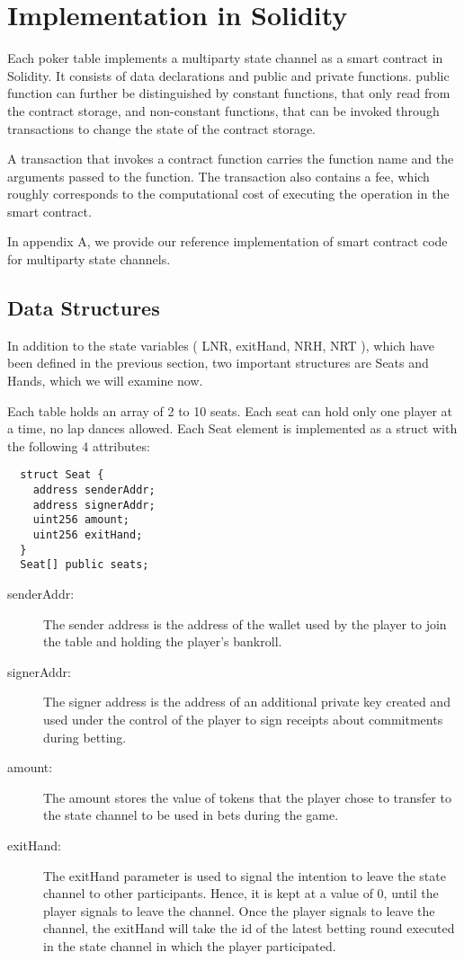 \section{Implementation in Solidity}

Each poker table implements a multiparty state channel as a smart contract in Solidity. It consists of data declarations and public and private functions. public function can further be distinguished by constant functions, that only read from the contract storage, and non-constant functions, that can be invoked through transactions to change the state of the contract storage.

A transaction that invokes a contract function carries the function name and the arguments passed to the function. The transaction also contains a fee, which roughly corresponds to the computational cost of executing the operation in the smart contract.

In appendix A, we provide our reference implementation of smart contract code for multiparty state channels.

\subsection{Data Structures}

In addition to the state variables ( LNR, exitHand, NRH, NRT ), which have been defined in the previous section, two important structures are Seats and Hands, which we will examine now.

Each table holds an array of 2 to 10 seats. Each seat can hold only one player at a time, no lap dances allowed. Each Seat element is implemented as a struct with the following 4 attributes:

\begin{verbatim}
  struct Seat {
    address senderAddr;
    address signerAddr;
    uint256 amount;
    uint256 exitHand;
  }
  Seat[] public seats;
\end{verbatim}

\begin{description}
\item[senderAddr:] The sender address is the address of the wallet used by the player to join the table and holding the player's bankroll.
\item[signerAddr:] The signer address is the address of an additional private key created and used under the control of the player to sign receipts about commitments during betting.
\item[amount:] The amount stores the value of tokens that the player chose to transfer to the state channel to be used in bets during the game.
\item[exitHand:] The exitHand parameter is used to signal the intention to leave the state channel to other participants. Hence, it is kept at a value of 0, until the player signals to leave the channel. Once the player signals to leave the channel, the exitHand will take the id of the latest betting round executed in the state channel in which the player participated.
\end{description}

